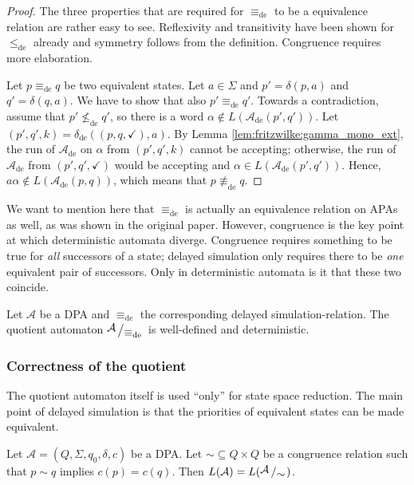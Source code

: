 \begin{proof}
	The three properties that are required for $\equiv_\text{de}$ to be a equivalence relation are rather easy to see. Reflexivity and transitivity have been shown for $\leq_\text{de}$ already and symmetry follows from the definition. Congruence requires more elaboration.

	Let $p \equiv_\text{de} q$ be two equivalent states. Let $a \in \Sigma$ and $p' = \delta(p, a)$ and $q' = \delta(q, a)$. We have to show that also $p' \equiv_\text{de} q'$. Towards a contradiction, assume that $p' \not\leq_\text{de} q'$, so there is a word $\alpha \notin L(\mathcal{A}_\text{de}(p', q'))$. Let $(p', q', k) = \delta_\text{de}((p, q, \checkmark), a)$. By Lemma \ref{lem:fritzwilke:gamma_mono_ext}, the run of $\mathcal{A}_\text{de}$ on $\alpha$ from $(p', q', k)$ cannot be accepting; otherwise, the run of $\mathcal{A}_\text{de}$ from $(p', q', \checkmark)$ would be accepting and $\alpha \in L(\mathcal{A}_\text{de}(p', q'))$. Hence, $a \alpha \notin L(\mathcal{A}_\text{de}(p, q))$, which means that $p \not\equiv_\text{de} q$.
\end{proof}

We want to mention here that $\equiv_\text{de}$ is actually an equivalence relation on APAs as well, as was shown in the original paper. However, congruence is the key point at which deterministic automata diverge. Congruence requires something to be true for \emph{all} successors of a state; delayed simulation only requires there to be \emph{one} equivalent pair of successors. Only in deterministic automata is it that these two coincide.

\begin{cor}
	Let $\mathcal{A}$ be a DPA and $\equiv_\text{de}$ the corresponding delayed simulation-relation. The quotient automaton $\bigslant{\mathcal{A}}{\equiv_\text{de}}$ is well-defined and deterministic.
\end{cor}



\vspace{1cm}
\subsubsection*{Correctness of the quotient}
The quotient automaton itself is used \enquote{only} for state space reduction. The main point of delayed simulation is that the priorities of equivalent states can be made equivalent. 

\begin{theorem}
	Let $\mathcal{A} = (Q, \Sigma, q_0, \delta, c)$ be a DPA. Let $\sim \subseteq Q \times Q$ be a congruence relation such that $p \sim q$ implies $c(p) = c(q)$. Then $L(\mathcal{A}) = L(\bigslant{\mathcal{A}}{\sim})$.
\end{theorem}

